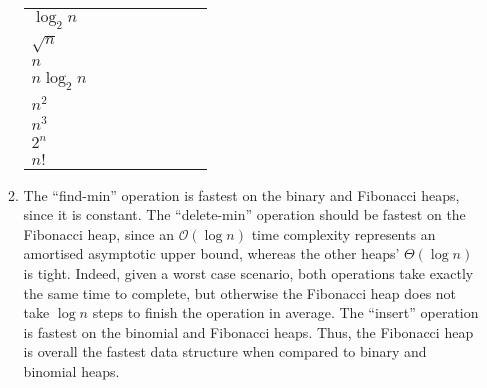 \documentclass[12pt]{article}
\begin{document}
\begin{enumerate}
\begin{enumerate}
\begin{table}[htbp]
\begin{tabular}{l*{7}{r}}
                    $\log_{2} n$ & & & & & & \\
                    $\sqrt{n}$   &  \\
                    $n$          &  \\
                    $n \log_{2} n$ & \\
                    $n^{2}$ & \\
                    $n^{3}$ & \\
                    $2^{n}$ & \\
                    $n!$ & \\
                \bottomrule
            \end{tabular}
            \label{tab:1}
        \end{table}
        \item The ``find-min'' operation is fastest on the binary and Fibonacci heaps, since it is constant. The ``delete-min'' operation should be fastest on the Fibonacci heap, since an $\mathcal{O}(\log n)$ time complexity represents an amortised asymptotic upper bound, whereas the other heaps' $\Theta(\log n)$ is tight. Indeed, given a worst case scenario, both operations take exactly the same time to complete, but otherwise the Fibonacci heap does not take $\log n$ steps to finish the operation in average. The ``insert'' operation is fastest on the binomial and Fibonacci heaps. Thus, the Fibonacci heap is overall the fastest data structure when compared to binary and binomial heaps.
    \end{enumerate}
\end{enumerate}
\end{document}
